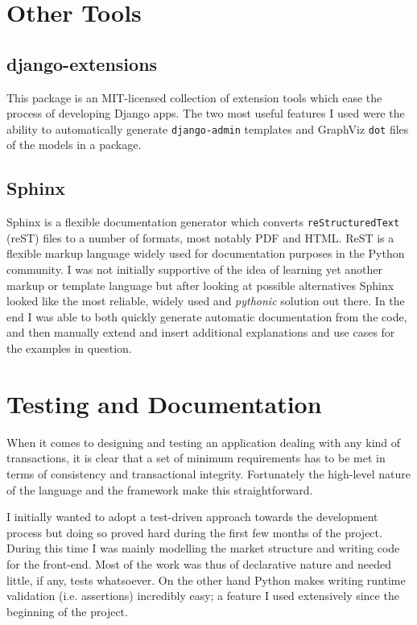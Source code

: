 \documentclass[bsc,frontabs,twoside,singlespacing,parskip,deptreport]{infthesis}     %
\begin{document}
\section{Other Tools}

\subsection{django-extensions}
    This package is an MIT-licensed collection of extension tools which ease the process of developing Django apps. The two most useful features I used were the ability to automatically generate {\tt django-admin} templates and GraphViz {\tt dot} files of the models in a package. 

\subsection{Sphinx}
    Sphinx is a flexible documentation generator which converts {\tt reStructuredText} (reST) files to a number of formats, most notably PDF and HTML. ReST is a flexible markup language widely used for documentation purposes in the Python community. I was not initially supportive of the idea of learning yet another markup or template language but after looking at possible alternatives Sphinx looked like the most reliable, widely used and {\em pythonic} solution out there. In the end I was able to both quickly generate automatic documentation from the code, and then manually extend and insert additional explanations and use cases for the examples in question.

\section{Testing and Documentation}
    When it comes to designing and testing an application dealing with any kind of transactions, it is clear that a set of minimum requirements has to be met in terms of consistency and transactional integrity. Fortunately the high-level nature of the language and the framework make this straightforward.

I initially wanted to adopt a test-driven approach towards the development process but doing so proved hard during  the first few months of the project. During this time I was mainly modelling the market structure and writing code for the front-end. Most of the work was thus of declarative nature and needed little, if any, tests whatsoever. On the other hand Python makes writing runtime validation (i.e. assertions) incredibly easy; a feature I used extensively since the beginning of the project. 
\end{document}
